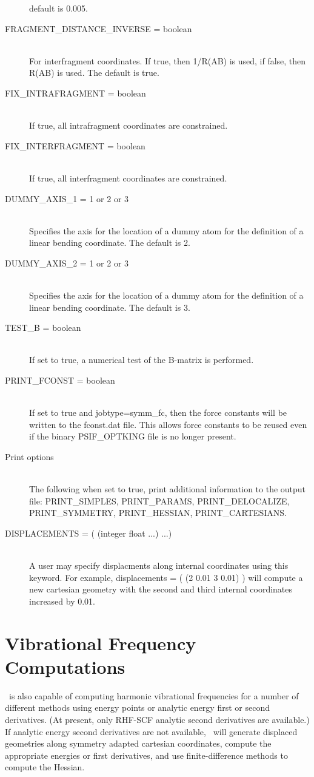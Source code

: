 \begin{description}
default is 0.005.
\item[FRAGMENT\_DISTANCE\_INVERSE = boolean]\mbox{}\\
For interfragment coordinates.  If true, then 1/R(AB) is used, if false,
then R(AB) is used.  The default is true.
\item[FIX\_INTRAFRAGMENT = boolean]\mbox{}\\
If true, all intrafragment coordinates are constrained.
\item[FIX\_INTERFRAGMENT = boolean]\mbox{}\\
If true, all interfragment coordinates are constrained.
\item[DUMMY\_AXIS\_1 = 1 or 2 or 3]\mbox{}\\
Specifies the axis for the location of a dummy atom for the definition
of a linear bending coordinate.  The default is 2.
\item[DUMMY\_AXIS\_2 = 1 or 2 or 3]\mbox{}\\
Specifies the axis for the location of a dummy atom for the definition
of a linear bending coordinate.  The default is 3.
\item[TEST\_B = boolean]\mbox{}\\
If set to true, a numerical test of the B-matrix is performed.
\item[PRINT\_FCONST = boolean]\mbox{}\\
If set to true and jobtype=symm\_fc, then the force constants will
be written to the fconst.dat file.  This allows force constants to be
reused even if the binary PSIF\_OPTKING file is no longer present.
\item[Print options]\mbox{}\\
The following when set to true, print additional information to the
output file: PRINT\_SIMPLES, PRINT\_PARAMS, PRINT\_DELOCALIZE,
PRINT\_SYMMETRY, PRINT\_HESSIAN, PRINT\_CARTESIANS.
\item[DISPLACEMENTS = ( (integer float ...) ...)]\mbox{}\\
A user may specify displacments along internal coordinates using this
keyword.  For example, displacements = ( (2 0.01 3 0.01) ) will compute
a new cartesian geometry with the second and third internal coordinates
increased by 0.01.
\end{description}


\section{Vibrational Frequency Computations} \label{sec:freq}
\PSIthree\ is also capable of computing harmonic vibrational frequencies
for a number of different methods using energy points or analytic energy first or
second derivatives.  (At present, only RHF-SCF analytic second derivatives
are available.)  If analytic energy second derivatives are not available,
\PSIthree\ will generate displaced geometries along symmetry adapted cartesian
coordinates, compute the appropriate energies or first derivatives, and use
finite-difference methods to compute the Hessian.


